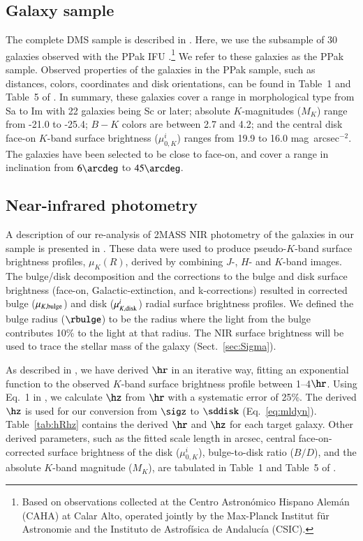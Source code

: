 \documentclass[traditabstract]{aa} %
\begin{document}
\subsection{Galaxy sample}
The complete DMS sample is described in . Here, we use the 
subsample of 30 galaxies observed with the PPak IFU
.\footnote{Based on observations collected at the
Centro Astron\'omico Hispano Alem\'an (CAHA) at Calar Alto, operated jointly by the 
Max-Planck Institut f\"ur Astronomie and the Instituto de Astrof\'isica de Andaluc\'ia
(CSIC).}
We refer to these galaxies as the PPak sample. Observed properties of the galaxies in the
PPak sample, such as distances, colors, coordinates and disk orientations, can be found in
Table~1 and Table~5 of .
In summary, these galaxies cover a range in morphological type from Sa to Im with 22
galaxies being Sc or later; absolute $K$-magnitudes ($M_K$) range from -21.0 to -25.4;
$B-K$ colors are between 2.7 and 4.2; and the central disk face-on $K$-band surface
brightness ($\mu_{0,K}^{i}$) ranges from 19.9 to 16.0 mag~arcsec$^{-2}$. The galaxies have
been selected to be close to face-on, and cover a range in inclination from $6\arcdeg$ to
$45\arcdeg$.


\subsection{Near-infrared photometry}
\label{sec:Photometry}
A description of our re-analysis of 2MASS NIR photometry of the galaxies in our sample
is presented in . These data were used to produce 
pseudo-$K$-band surface brightness profiles, $\mu_{K}(R)$, derived by combining 
$J$-, $H$- and $K$-band images.
The bulge/disk decomposition and the corrections to the bulge and disk surface brightness
(face-on, Galactic-extinction, and k-corrections) resulted in corrected bulge
($\mu_{K,\rm bulge}$) and disk ($\mu_{K,\rm disk}^{i}$) radial surface brightness profiles.
We defined the bulge radius ($\rbulge$) to be the radius where the light from the bulge
contributes 10\% to the light at that radius.
The NIR surface brightness will be used to trace the stellar mass of the galaxy
(Sect.~\ref{sec:Sigma}).

As described in , we have derived $\hr$ in an iterative way,
fitting an exponential function to the observed $K$-band surface brightness profile 
between 1--4$\hr$. Using Eq.~1 in , we calculate $\hz$ from
$\hr$ with a systematic error of 25\%. The derived $\hz$ is used for our conversion from
$\sigz$ to $\sddisk$ (Eq.~\ref{eq:mldyn}). Table~\ref{tab:hRhz} contains the derived
$\hr$ and $\hz$ for each target galaxy. Other derived parameters, such as the fitted scale
length in arcsec, central face-on-corrected surface brightness of the disk 
($\mu_{0,K}^{i}$), bulge-to-disk ratio ($B/D$), and the absolute $K$-band magnitude 
($M_K$), are tabulated in Table~1 and Table~5 of .
\end{document}
